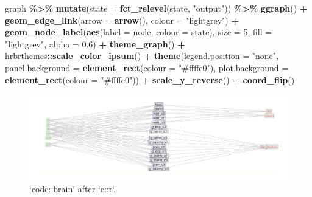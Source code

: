 \documentclass[
]{article}
\newenvironment{Shaded}{\begin{snugshade}}{\end{snugshade}}
\newcommand{\DataTypeTok}[1]{\textcolor[rgb]{0.13,0.29,0.53}{#1}}
\newcommand{\DecValTok}[1]{\textcolor[rgb]{0.00,0.00,0.81}{#1}}
\newcommand{\FloatTok}[1]{\textcolor[rgb]{0.00,0.00,0.81}{#1}}
\newcommand{\KeywordTok}[1]{\textcolor[rgb]{0.13,0.29,0.53}{\textbf{#1}}}
\newcommand{\NormalTok}[1]{#1}
\newcommand{\OperatorTok}[1]{\textcolor[rgb]{0.81,0.36,0.00}{\textbf{#1}}}
\newcommand{\StringTok}[1]{\textcolor[rgb]{0.31,0.60,0.02}{#1}}
\begin{document}
\begin{Shaded}
\begin{Highlighting}[]
\NormalTok{graph }\OperatorTok{\%>\%}\StringTok{ }
\StringTok{  }\KeywordTok{mutate}\NormalTok{(}\DataTypeTok{state =} \KeywordTok{fct\_relevel}\NormalTok{(state, }\StringTok{"output"}\NormalTok{)) }\OperatorTok{\%>\%}\StringTok{ }
\StringTok{  }\KeywordTok{ggraph}\NormalTok{() }\OperatorTok{+}
\StringTok{  }\KeywordTok{geom\_edge\_link}\NormalTok{(}\DataTypeTok{arrow =} \KeywordTok{arrow}\NormalTok{(), }\DataTypeTok{colour =} \StringTok{"lightgrey"}\NormalTok{) }\OperatorTok{+}\StringTok{ }
\StringTok{  }\KeywordTok{geom\_node\_label}\NormalTok{(}\KeywordTok{aes}\NormalTok{(}\DataTypeTok{label =}\NormalTok{ node, }\DataTypeTok{colour =}\NormalTok{ state),  }
                  \DataTypeTok{size =} \DecValTok{5}\NormalTok{,}
                  \DataTypeTok{fill =} \StringTok{"lightgrey"}\NormalTok{,}
                  \DataTypeTok{alpha =} \FloatTok{0.6}\NormalTok{) }\OperatorTok{+}
\StringTok{  }\KeywordTok{theme\_graph}\NormalTok{() }\OperatorTok{+}
\StringTok{  }\NormalTok{hrbrthemes}\OperatorTok{::}\KeywordTok{scale\_color\_ipsum}\NormalTok{() }\OperatorTok{+}
\StringTok{  }\KeywordTok{theme}\NormalTok{(}\DataTypeTok{legend.position =} \StringTok{"none"}\NormalTok{,}
        \DataTypeTok{panel.background =} \KeywordTok{element\_rect}\NormalTok{(}\DataTypeTok{colour =} \StringTok{"\#ffffe0"}\NormalTok{),}
        \DataTypeTok{plot.background =} \KeywordTok{element\_rect}\NormalTok{(}\DataTypeTok{colour =} \StringTok{"\#ffffe0"}\NormalTok{)) }\OperatorTok{+}\StringTok{ }
\StringTok{  }\KeywordTok{scale\_y\_reverse}\NormalTok{() }\OperatorTok{+}\StringTok{ }
\StringTok{  }\KeywordTok{coord\_flip}\NormalTok{()}
\end{Highlighting}
\end{Shaded}

\begin{figure}

{\centering \includegraphics{when-is-done-done_files/figure-latex/unnamed-chunk-15-1} 

}

\caption{`code::brain` after `c::r`.}\label{fig:unnamed-chunk-15}
\end{figure}
\end{document}
